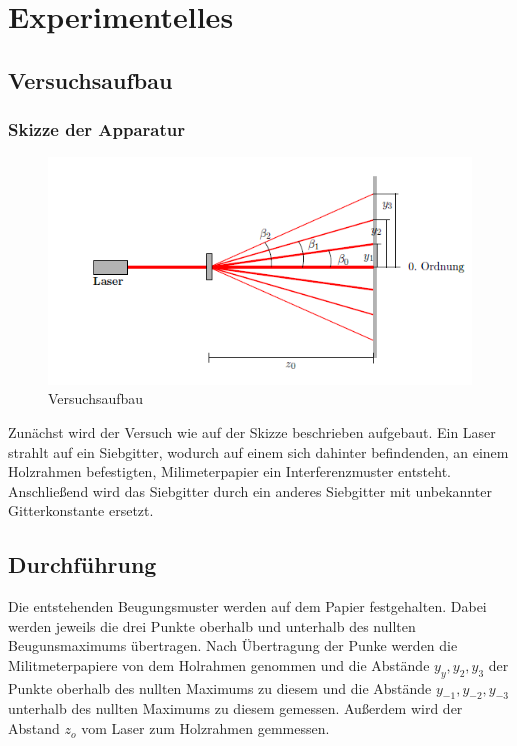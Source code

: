 \documentclass[12pt,a4paper,titlepage,headinclude,bibtotoc]{scrartcl}
\begin{document}
\section{Experimentelles}

\subsection{Versuchsaufbau}

\subsubsection{Skizze der Apparatur}
\begin{figure} [h]
\begin{center}
\includegraphics[scale=1]{Versuchsaufbau.png} \end{center}
\caption{Versuchsaufbau}
\end{figure}

Zunächst wird der Versuch wie auf der Skizze beschrieben aufgebaut.
Ein Laser strahlt auf ein Siebgitter, wodurch auf einem sich dahinter befindenden, an einem Holzrahmen befestigten, Milimeterpapier ein Interferenzmuster entsteht. Anschließend wird das Siebgitter durch ein anderes Siebgitter mit unbekannter Gitterkonstante ersetzt.


\subsection{Durchführung}
Die entstehenden Beugungsmuster werden auf dem Papier festgehalten. Dabei werden jeweils die drei Punkte  oberhalb und unterhalb des nullten Beugunsmaximums übertragen.
Nach Übertragung der Punke werden die Militmeterpapiere von dem Holrahmen genommen und die Abstände $y_{y},y_{2},y_{3}$ der Punkte oberhalb des nullten Maximums zu diesem und die Abstände $y_{-1},y_{-2},y_{-3}$ unterhalb des nullten Maximums zu diesem gemessen. Außerdem wird der Abstand $z_{o}$ vom Laser zum Holzrahmen gemmessen.
\end{document}
